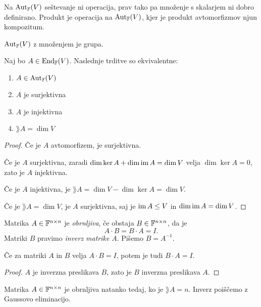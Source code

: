 \documentclass[12pt, a4paper]{article}
\begin{document}
Na $\operatorname{Aut}_{\mathbb{F}}(V)$ seštevanje ni operacija, prav tako pa množenje s skalarjem ni dobro definirano. Produkt je operacija na $\operatorname{Aut}_{\mathbb{F}}(V)$, kjer je produkt avtomorfizmov njun kompozitum.

\begin{trditev}
$\operatorname{Aut}_{\mathbb{F}}(V)$ z množenjem je grupa.
\end{trditev}

\obvs

\begin{trditev}
Naj bo $A\in\operatorname{End}_{\mathbb{F}}(V)$. Naslednje trditve so ekvivalentne:

\begin{enumerate}[label=\roman*)]
\item $A\in\operatorname{Aut}_{\mathbb{F}}(V)$
\item $A$ je surjektivna
\item $A$ je injektivna
\item $\rang A=\dim V$
\end{enumerate}
\end{trditev}

\begin{proof}
Če je $A$ avtomorfizem, je surjektivna.

Če je $A$ surjektivna, zaradi $\dim\ker A+\dim\operatorname{im} A=\dim V$ velja $\dim\ker A=0$, zato je $A$ injektivna.

Če je $A$ injektivna, je $\rang A=\dim V-\dim\ker A=\dim V$.

Če je $\rang A=\dim V$, je $A$ surjektivna, saj je $\operatorname{im} A\leq V$ in $\dim\operatorname{im} A=\dim V$.
\end{proof}

\begin{definicija}
Matrika $A\in\mathbb{F}^{n\times n}$ je \emph{obrnljiva}, če obstaja $B\in\mathbb{F}^{n\times n}$, da je
\[
A\cdot B=B\cdot A=I.
\]
Matriki $B$ pravimo \emph{inverz matrike} $A$. Pišemo $B=A^{-1}$.
\end{definicija}

\begin{opomba}
Če za matriki $A$ in $B$ velja $A\cdot B=I$, potem je tudi $B\cdot A=I$.
\end{opomba}

\begin{proof}
$A$ je inverzna preslikava $B$, zato je $B$ inverzna preslikava $A$.
\end{proof}

\begin{opomba}
Matrika $A\in\mathbb{F}^{n\times n}$ je obrnljiva natanko tedaj, ko je $\rang A=n$. Inverz poiščemo z Gaussovo eliminacijo.
\end{opomba}
\end{document}
